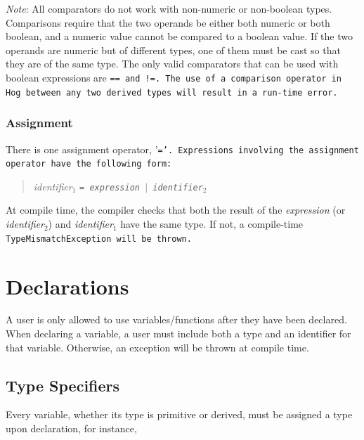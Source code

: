 \documentclass{report}
\begin{document}
\emph{Note}: All comparators do not work with non-numeric or non-boolean types.
Comparisons require that the two operands be either both numeric or both
boolean, and a numeric value cannot be compared to a boolean value. If the two
operands are numeric but of different types, one of them must be cast so that
they are of the same type. The only valid comparators that can be used with
boolean expressions are \tt == \rm and \tt !=\rm. The use of a comparison
operator in Hog between any two derived types will result in a run-time error.


\subsubsection{Assignment} %
\label{ssub:assignment}

There is one assignment operator, '\tt =\rm'. Expressions involving the
assignment operator have the following form:

\begin{quotation}
\emph{identifier}$_1$ \tt = \rm \emph{expression} $|$ \emph{identifier}$_2$
\end{quotation}

At compile time, the compiler checks that both the result of the \emph{expression}
(or \emph{identifier}$_2$) and \emph{identifier}$_1$ have the same type. If not, a
compile-time \tt TypeMismatchException \rm will be thrown.




\section{Declarations} %
\label{sec:declarations}

A user is only allowed to use variables/functions after they have been
declared. When declaring a variable, a user must include both a type and an
identifier for that variable. Otherwise, an exception will be thrown at compile
time.

\subsection{Type Specifiers} %
\label{sub:type_specifiers}

Every variable, whether its type is primitive or derived, must be assigned a
type upon declaration, for instance,
\end{document}
